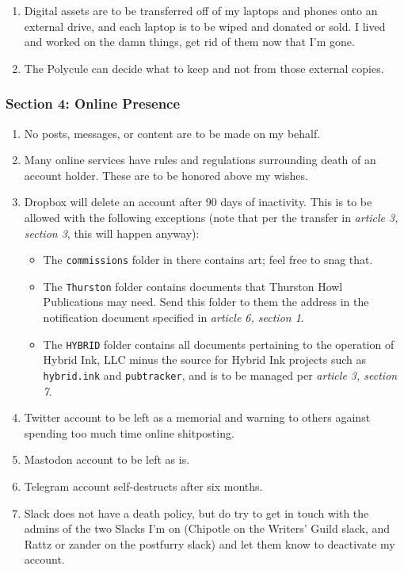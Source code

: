 \documentclass[oneside]{memoir}
\begin{document}
\begin{enumerate}
\def\labelenumi{\arabic{enumi}.}
\tightlist
\item
  Digital assets are to be transferred off of my laptops and phones onto an external drive, and each laptop is to be wiped and donated or sold. I lived and worked on the damn things, get rid of them now that I'm gone.
\item
  The Polycule can decide what to keep and not from those external copies.
\end{enumerate}

\subsubsection*{Section 4: Online Presence}\label{section-4-online-presence}

\begin{enumerate}
\def\labelenumi{\arabic{enumi}.}
\tightlist
\item
  No posts, messages, or content are to be made on my behalf.
\item
  Many online services have rules and regulations surrounding death of an account holder. These are to be honored above my wishes.
\item
  Dropbox will delete an account after 90 days of inactivity. This is to be allowed with the following exceptions (note that per the transfer in \emph{article 3, section 3}, this will happen anyway):

  \begin{itemize}
  \tightlist
  \item
    The \texttt{commissions} folder in there contains art; feel free to snag that.
  \item
    The \texttt{Thurston} folder contains documents that Thurston Howl Publications may need. Send this folder to them the address in the notification document specified in \emph{article 6, section 1}.
  \item
    The \texttt{HYBRID} folder contains all documents pertaining to the operation of Hybrid Ink, LLC minus the source for Hybrid Ink projects such as \texttt{hybrid.ink} and \texttt{pubtracker}, and is to be managed per \emph{article 3, section 7}.
  \end{itemize}
\item
  Twitter account to be left as a memorial and warning to others against spending too much time online shitposting.
\item
  Mastodon account to be left as is.
\item
  Telegram account self-destructs after six months.
\item
  Slack does not have a death policy, but do try to get in touch with the admins of the two Slacks I'm on (Chipotle on the Writers' Guild slack, and Rattz or zander on the postfurry slack) and let them know to deactivate my account.
\end{enumerate}
\end{document}
